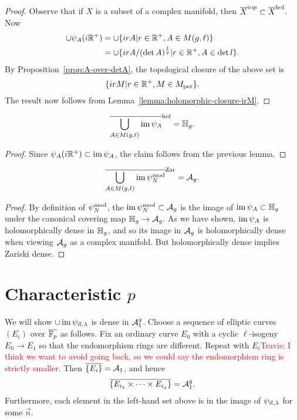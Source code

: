 \documentclass{amsart}
\begin{document}
\begin{proof}
  Observe that if $X$ is a subset of a complex manifold, then $\overline{X}^\mathrm{top} \subset \overline{X}^\mathrm{hol}$. Now
  \begin{align*}
    \cup \psi_A(i\mathbb{R}^+) &= \cup \{irA | r \in \mathbb{R}^+, A \in M(g,\ell)\} \\
               &= \cup \{irA/(\det A)^{\frac{1}{g}} | r \in \mathbb{R}^+, A \in \det l\}.
  \end{align*}
  By Proposition~\ref{prop:A-over-detA}, the topological closure of the above set is
  \[
    \{irM | r \in \mathbb{R}^+, M \in M_{\textrm{per}}\}.
  \]
  The result now follows from Lemma~\ref{lemma:holomorphic-closure-irM}.
\end{proof}

\begin{lemma}
  \[
    \overline{\bigcup_{A \in M(g,\ell)} \operatorname{im} \psi_A}^\mathrm{hol} = \mathbb{H}_g.
  \]
\end{lemma}

\begin{proof}
  Since $\psi_A(i\mathbb{R}^+) \subset \operatorname{im} \psi_A$, the claim follows from the previous lemma.
\end{proof}

\begin{proposition}
  \[
    \overline{\bigcup_{A \in M(g,\ell)} \operatorname{im} \psi_N^{\textrm{mod}}}^\mathrm{Zar} = \mathcal{A}_g.
  \]
\end{proposition}

\begin{proof}
  By definition of $\psi_N^{\textrm{mod}}$, the $\operatorname{im} \psi_N^{\textrm{mod}} \subset \mathcal{A}_g$ is the image of $\operatorname{im} \psi_A \subset \mathbb{H}_g$ under the canonical covering map $\mathbb{H}_g \to \mathcal{A}_g$. As we have shown, $\operatorname{im} \psi_A$ is holomorphically dense in $\mathbb{H}_g$, and so its image in $\mathcal{A}_g$ is holomorphically dense when viewing $\mathcal{A}_g$ as a complex manifold. But holomorphically dense implies Zariski dense.
\end{proof}

\section{Characteristic $p$}
\label{sec:characteristic-p}

We will show $\cup \operatorname{im} \psi_{\vec{n},\lambda}$ is dense in $\mathcal{A}_1^g$. Choose a sequence of elliptic curves $(E_i)$ over $\overline{\mathbb{F}_p}$ as follows. Fix an ordinary curve $E_0$ with a cyclic $\ell$-isogeny $E_0 \to E_1$ so that the endomorphism rings are different. Repeat with $E_i$\textcolor{red}{Travis: I think we want to avoid going back, so we could say the endomorphism ring is strictly smaller}. Then $\overline{\{E_i\}} = \mathcal{A}_1$, and hence
\[
  \overline{\{E_{i_1} \times \cdots \times E_{i_g}\}} = \mathcal{A}_1^g.
\]
Furthermore, each element in the left-hand set above is in the image of $\psi_{\vec{n},\lambda}$ for some $\vec{n}$.



\end{document}
